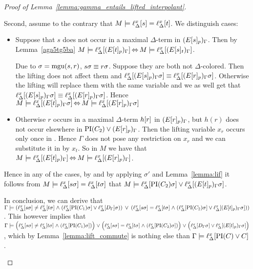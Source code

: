 \begin{proof}[Proof of Lemma~\ref{lemma:gamma_entails_lifted_interpolant}]
\begin{description}
\begin{enumerate}
						Second, assume to the contrary that $M \models \ell_{\Delta}^{x}[s] = \ell_{\Delta}^{x}[t]$.
						We distinguish cases:
						\begin{itemize}
							\item
								Suppose that $s$ does not occur in a maximal $\Delta$-term in $(E{[s]_{p}})_\Gamma$.
								Then by Lemma~\ref{aga5tg5ba} $M\models \ell_{\Delta}^{x}[(E{[t]_{p}})_\Gamma] \operatorname{\Leftrightarrow} M \models \ell_{\Delta}^{x}[(E{[s]_{t}})_\Gamma]$.

								Due to $\sigma=\operatorname{mgu}(s, r)$, $s\sigma \equiv r\sigma$.
								Suppose they are both not $\Delta$-colored.
								Then the lifting does not affect them and 
								$\ell_{\Delta}^{x}[(E{[s]_{p}})_\Gamma\sigma] \equiv \ell_{\Delta}^{x}[(E{[r]_{p}})_\Gamma\sigma]$.
								Otherwise the lifting will replace them with the same variable and we as well get that
								$\ell_{\Delta}^{x}[(E{[s]_{p}})_\Gamma\sigma] \equiv \ell_{\Delta}^{x}[(E{[r]_{p}})_\Gamma\sigma]$.
								Hence $M\models \ell_{\Delta}^{x}[(E{[t]_{p}})_\Gamma\sigma] \operatorname{\Leftrightarrow}\allowbreak M\models 
								\ell_{\Delta}^{x}[(E{[r]_{p}})_\Gamma\sigma]$

							\item
								Otherwise $r$ occurs in a maximal $\Delta$-term $h[r]$ in $(E{[r]_{p}})_\Gamma$, but $h(r)$ does not occur elsewhere in $\operatorname{PI}(C_2) \lor (E{[r]_{p}})_\Gamma$.
								Then the lifting variable $x_r$ occurs only once in \markB{}.
								Hence $\Gamma$ does not pose any restriction on $x_r$ and we can substitute it in  by $x_t$. 
								So in $M$ we have that $M\models \ell_{\Delta}^{x}[(E{[t]_{p}})_\Gamma] \operatorname{\Leftrightarrow}\allowbreak M\models \ell_{\Delta}^{x}[(E{[r]_{p}})_\Gamma]$.

						\end{itemize}

						Hence in any of the cases, by \markB{} and by applying $\sigma'$ and Lemma~\ref{lemma:lif}
						it follows from $M\models \ell_{\Delta}^{x}[s\sigma] = \ell_{\Delta}^{x}[t\sigma]$ 
						that $M \models \ell_{\Delta}^{x}[\operatorname{PI}(C_2)\sigma] \lor \ell_{\Delta}^{x}[(E{[t]_{p}})_\Gamma\sigma]$. 
						\medskip

						In conclusion, we can derive that 
						$\Gamma \models
						(\ell_{\Delta}^{x}[s\sigma] \neq \ell_{\Delta}^{x}[t\sigma] \;{\land}\;\allowbreak (\ell_{\Delta}^{x}[\operatorname{PI}(C_1)\sigma] \lor \ell_{\Delta}^{x}[D_\Gamma]\sigma))
						\;\,{\lor}\;\,\allowbreak
						(\ell_{\Delta}^{x}[s\sigma] = \ell_{\Delta}^{x}[t\sigma] \;{\land}\; (\ell_{\Delta}^{x}[\operatorname{PI}(C_2)\sigma] \lor \ell_{\Delta}^{x}[(E{[t]_{p}})_\Gamma\sigma]))$.
						This however implies that
						$\Gamma \entails
						\Big(\lifdelta{s\sigma} \neq \lifdelta{t\sigma} \spas\land (\lifdelta{\PI(C_1)\sigma} )\Big)
						\spas{\lor}\allowbreak
						\Big(\lifdelta{s\sigma} =\nolinebreak \lifdelta{t\sigma} \spas\land (\lifdelta{\PI(C_2)\sigma}) \Big)
						\spas\lor\allowbreak \Big(\lifdelta{D_\Gamma\sigma} \lor \lifdelta{(E\occat{t}{p})_\Gamma\sigma}\Big)$, 
					which by Lemma~\ref{lemma:lift_commute} is nothing else than
						$\Gamma \models \ell_{\Delta}^{x}[\operatorname{PI}(C) \lor C]$.


\end{enumerate}
\end{description}
\end{proof}
